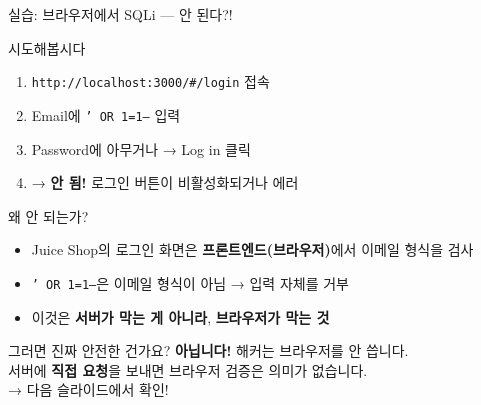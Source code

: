 \documentclass[aspectratio=169,10pt]{beamer}
\newcommand{\hlt}[1]{\textcolor{accent}{\textbf{#1}}}
\newcommand{\red}[1]{\textcolor{redTeam}{\textbf{#1}}}
\begin{document}
\begin{frame}{실습: 브라우저에서 SQLi — 안 된다?!}

\begin{block}{시도해봅시다}
\begin{enumerate}
    \item \texttt{http://localhost:3000/\#/login} 접속
    \item Email에 \texttt{' OR 1=1--} 입력
    \item Password에 아무거나 → Log in 클릭
    \item → \red{안 됨!} 로그인 버튼이 비활성화되거나 에러
\end{enumerate}
\end{block}

\vspace{0.5em}
\begin{block}{왜 안 되는가?}
\begin{itemize}
    \item Juice Shop의 로그인 화면은 \textbf{프론트엔드(브라우저)}에서 이메일 형식을 검사
    \item \texttt{' OR 1=1--}은 이메일 형식이 아님 → 입력 자체를 거부
    \item 이것은 \textbf{서버가 막는 게 아니라}, \hlt{브라우저가 막는 것}
\end{itemize}
\end{block}

\vspace{0.5em}
\begin{alertblock}{그러면 진짜 안전한 건가요?}
\hlt{아닙니다!} 해커는 브라우저를 안 씁니다.\\
서버에 \textbf{직접 요청}을 보내면 브라우저 검증은 의미가 없습니다.\\
→ 다음 슬라이드에서 확인!
\end{alertblock}
\end{frame}
\end{document}
